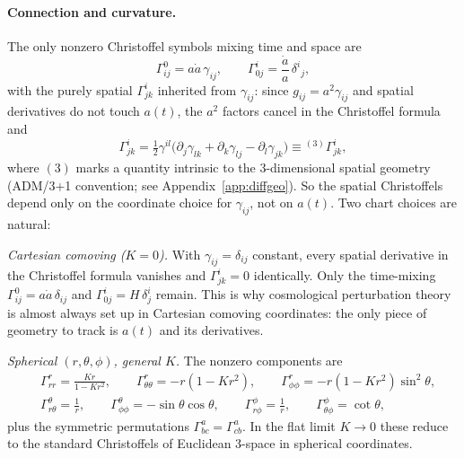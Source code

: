 \documentclass[12pt]{article}
\begin{document}
\paragraph{Connection and curvature.}
The only nonzero Christoffel symbols mixing time and space are
%
\begin{equation}
  \Gamma^0_{ij} = a\dot a\,\gamma_{ij},
  \qquad
  \Gamma^i_{0j} = \frac{\dot a}{a}\,\delta^i{}_j,
\end{equation}
%
with the purely spatial $\Gamma^i_{jk}$ inherited from $\gamma_{ij}$:
since $g_{ij} = a^2\gamma_{ij}$ and spatial derivatives do not touch
$a(t)$, the $a^2$ factors cancel in the Christoffel formula and
%
\begin{equation}
  \Gamma^i_{jk} = \tfrac{1}{2}\gamma^{il}
    \bigl(\partial_j\gamma_{lk} + \partial_k\gamma_{lj}
          - \partial_l\gamma_{jk}\bigr)
  \equiv {}^{(3)}\Gamma^i_{jk},
\end{equation}
%
where $(3)$ marks a quantity intrinsic to the 3-dimensional spatial
geometry (ADM/3+1 convention; see Appendix~\ref{app:diffgeo}).  So
the spatial Christoffels depend only on the coordinate choice for
$\gamma_{ij}$, not on $a(t)$.  Two chart choices are natural:

\emph{Cartesian comoving ($K=0$).}  With $\gamma_{ij} = \delta_{ij}$
constant, every spatial derivative in the Christoffel formula
vanishes and $\Gamma^i_{jk} = 0$ identically.  Only the time-mixing
$\Gamma^0_{ij} = a\dot a\,\delta_{ij}$ and $\Gamma^i_{0j} = H\,\delta^i_j$
remain.  This is why cosmological perturbation theory is almost
always set up in Cartesian comoving coordinates: the only piece of
geometry to track is $a(t)$ and its derivatives.

\emph{Spherical $(r,\theta,\phi)$, general $K$.}  The nonzero
components are
%
\begin{equation}
  \begin{aligned}
    &\Gamma^r_{rr} = \frac{Kr}{1-Kr^2},\qquad
    \Gamma^r_{\theta\theta} = -r(1-Kr^2),\qquad
    \Gamma^r_{\phi\phi} = -r(1-Kr^2)\sin^2\theta,\\[2pt]
    &\Gamma^\theta_{r\theta} = \frac{1}{r},\qquad
    \Gamma^\theta_{\phi\phi} = -\sin\theta\cos\theta,\qquad
    \Gamma^\phi_{r\phi} = \frac{1}{r},\qquad
    \Gamma^\phi_{\theta\phi} = \cot\theta,
  \end{aligned}
  \label{eq:christoffel_spatial}
\end{equation}
%
plus the symmetric permutations $\Gamma^a_{bc} = \Gamma^a_{cb}$.  In
the flat limit $K\to 0$ these reduce to the standard Christoffels of
Euclidean 3-space in spherical coordinates.
\end{document}
